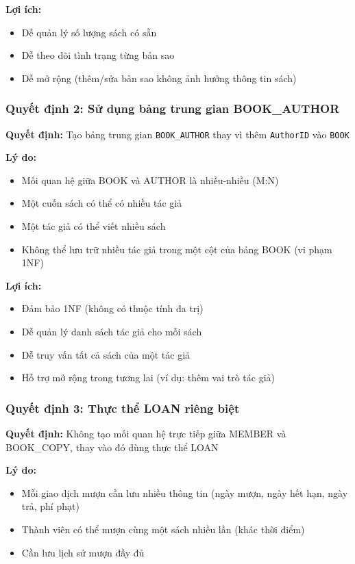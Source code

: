 \documentclass[12pt,a4paper]{article}
\begin{document}
\textbf{Lợi ích:}
\begin{itemize}
    \item Dễ quản lý số lượng sách có sẵn
    \item Dễ theo dõi tình trạng từng bản sao
    \item Dễ mở rộng (thêm/sửa bản sao không ảnh hưởng thông tin sách)
\end{itemize}

\subsubsection{Quyết định 2: Sử dụng bảng trung gian BOOK\_AUTHOR}

\textbf{Quyết định:} Tạo bảng trung gian \texttt{BOOK\_AUTHOR} thay vì thêm \texttt{AuthorID} vào \texttt{BOOK}

\textbf{Lý do:}
\begin{itemize}
    \item Mối quan hệ giữa BOOK và AUTHOR là nhiều-nhiều (M:N)
    \item Một cuốn sách có thể có nhiều tác giả
    \item Một tác giả có thể viết nhiều sách
    \item Không thể lưu trữ nhiều tác giả trong một cột của bảng BOOK (vi phạm 1NF)
\end{itemize}

\textbf{Lợi ích:}
\begin{itemize}
    \item Đảm bảo 1NF (không có thuộc tính đa trị)
    \item Dễ quản lý danh sách tác giả cho mỗi sách
    \item Dễ truy vấn tất cả sách của một tác giả
    \item Hỗ trợ mở rộng trong tương lai (ví dụ: thêm vai trò tác giả)
\end{itemize}

\subsubsection{Quyết định 3: Thực thể LOAN riêng biệt}

\textbf{Quyết định:} Không tạo mối quan hệ trực tiếp giữa MEMBER và BOOK\_COPY, thay vào đó dùng thực thể LOAN

\textbf{Lý do:}
\begin{itemize}
    \item Mỗi giao dịch mượn cần lưu nhiều thông tin (ngày mượn, ngày hết hạn, ngày trả, phí phạt)
    \item Thành viên có thể mượn cùng một sách nhiều lần (khác thời điểm)
    \item Cần lưu lịch sử mượn đầy đủ
\end{itemize}
\end{document}
